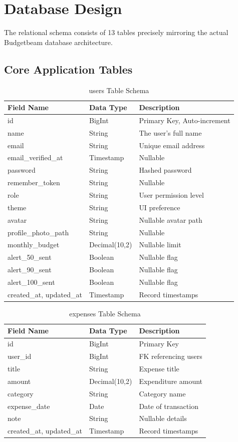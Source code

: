 \section{Database Design}
The relational schema consists of 13 tables precisely mirroring the actual Budgetbeam database architecture.

\subsection{Core Application Tables}
\begin{longtable}{|l|l|p{7.5cm}|}
\caption{users Table Schema} \\
\hline
\textbf{Field Name} & \textbf{Data Type} & \textbf{Description} \\ \hline
id & BigInt & Primary Key, Auto-increment \\ \hline
name & String & The user's full name \\ \hline
email & String & Unique email address \\ \hline
email\_verified\_at & Timestamp & Nullable \\ \hline
password & String & Hashed password \\ \hline
remember\_token & String & Nullable \\ \hline
role & String & User permission level \\ \hline
theme & String & UI preference \\ \hline
avatar & String & Nullable avatar path \\ \hline
profile\_photo\_path & String & Nullable \\ \hline
monthly\_budget & Decimal(10,2) & Nullable limit \\ \hline
alert\_50\_sent & Boolean & Nullable flag \\ \hline
alert\_90\_sent & Boolean & Nullable flag \\ \hline
alert\_100\_sent & Boolean & Nullable flag \\ \hline
created\_at, updated\_at & Timestamp & Record timestamps \\ \hline
\end{longtable}

\begin{longtable}{|l|l|p{7.5cm}|}
\caption{expenses Table Schema} \\
\hline
\textbf{Field Name} & \textbf{Data Type} & \textbf{Description} \\ \hline
id & BigInt & Primary Key \\ \hline
user\_id & BigInt & FK referencing users \\ \hline
title & String & Expense title \\ \hline
amount & Decimal(10,2) & Expenditure amount \\ \hline
category & String & Category name \\ \hline
expense\_date & Date & Date of transaction \\ \hline
note & String & Nullable details \\ \hline
created\_at, updated\_at & Timestamp & Record timestamps \\ \hline
\end{longtable}

